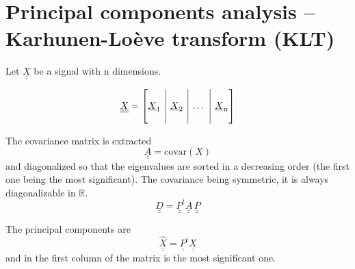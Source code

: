 \documentclass[11pt,oneside,a4paper]{memoir}
\author{\theauthor}
\title{\thetitle}
\renewcommand{\vec}[1]{\underline{#1}}
\newcommand{\mat}[1]{\underline{\underline{#1}}}
\begin{document}
\frontmatter
\clearpage
\thispagestyle{empty}
\maketitle
\vfill
\begin{abstract}
       ......
\end{abstract}
\vfill

\cleardoublepage

\tableofcontents*
\listoffigures*

\mainmatter





\renewcommand\cftappendixname{\appendixname~}



\appendix
\appendixpage
\chapter{Principal components analysis -- Karhunen-Loève transform (KLT)}
\label{apx:KLT}

Let $\mat{X}$ be a signal with n dimensions.

\begin{equation}
\mat{X} = \left[
\begin{array}{@{}c|c|c|c@{}}
&&&\\ \vec{X}_1 & \vec{X}_2 & \dots & \vec{X}_n \\ &&&
\end{array}
\right]
\end{equation} 

The covariance matrix is extracted
\begin{equation}
\mat{A} = \text{covar}(X) 
\end{equation}
and diagonalized so that the eigenvalues are sorted in a decreasing order (the first one being the most significant). The covariance being symmetric, it is always diagonalizable in $\mathbb{R}$.
\begin{equation}
\mat{D} = \mat{P}^{t} \mat{A} \, \mat{P} 
\end{equation}

The principal components are 
\begin{equation}
\hat{\mat{X}} = \mat{P}^{t} \mat{X}
\end{equation}
and in the first column of the matrix is the most significant one.
\end{document}
